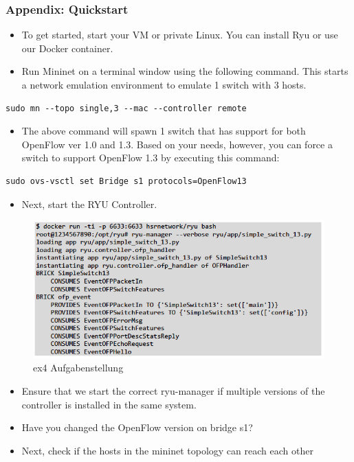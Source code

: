 \documentclass[a4,12pt]{scrartcl}
\begin{document}
\subsubsection{Appendix: Quickstart}
\begin{itemize}
\item To get started, start your VM or private Linux. You can install Ryu or use our Docker container.
\item Run Mininet on a terminal window using the following command. This starts a network emulation environment to emulate 1 switch with 3 hosts.
\end{itemize} 
\begin{lstlisting}
sudo mn --topo single,3 --mac --controller remote
\end{lstlisting}
\begin{itemize}
\item The above command will spawn 1 switch that has support for both OpenFlow ver 1.0 and 1.3. Based on your needs, however, you can force a switch to support OpenFlow 1.3 by executing this command:
\end{itemize}
\begin{lstlisting}
sudo ovs-vsctl set Bridge s1 protocols=OpenFlow13
\end{lstlisting}
\begin{itemize}
\item Next, start the RYU Controller.
\end{itemize}
\begin{figure} [H]
	\begin{center}
	\includegraphics[width=1.00\textwidth]{./pictures/ex4_aufgabenstellung3.png}
	\caption{ex4 Aufgabenstellung}
	\label{x}
	\end{center}
\end{figure} 
\newpage
\begin{itemize}
\item Ensure that we start the correct ryu-manager if multiple versions of the controller is installed in the same system.
\item Have you changed the OpenFlow version on bridge s1?
\item Next, check if the hosts in the mininet topology can reach each other
\end{itemize}
\end{document}
